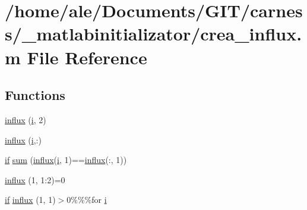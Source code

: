 \hypertarget{a00058}{\section{/home/ale/\-Documents/\-G\-I\-T/carness/\-\_\-matlabinitializator/crea\-\_\-influx.m File Reference}
\label{a00058}
}
\subsection*{Functions}
\begin{DoxyCompactItemize}
\item 
\hyperlink{a00058_a0fbac6c3f9b5a2d3cc1b576ab1cc6321}{influx} (\hyperlink{a00065_ad3efca1ea6e3333daf30719ee0501862}{i}, 2)
\item 
\hyperlink{a00058_a13a0f382c5677ab166d9109a493cbd0c}{influx} (\hyperlink{a00065_ad3efca1ea6e3333daf30719ee0501862}{i},\-:)
\item 
\hyperlink{a00024_a01d55766b8058903dd360b4bda71f9f5}{if} \hyperlink{a00058_a59a869fb2b28d56dacd91c09e1dffc8d}{sum} (\hyperlink{a00059_a902e747aeec6b345d3a057099152f41f}{influx}(\hyperlink{a00065_ad3efca1ea6e3333daf30719ee0501862}{i}, 1)==\hyperlink{a00059_a902e747aeec6b345d3a057099152f41f}{influx}(\-:, 1))
\item 
\hyperlink{a00058_a4ef89096a50d152e533ee51aca1c5189}{influx} (1, 1\-:2)=0
\item 
\hyperlink{a00024_a01d55766b8058903dd360b4bda71f9f5}{if} \hyperlink{a00058_a275d5adacb8e442c595845d6ed25e27a}{influx} (1, 1)$>$0\%\%\%for \hyperlink{a00065_ad3efca1ea6e3333daf30719ee0501862}{i}
\end{DoxyCompactItemize}
